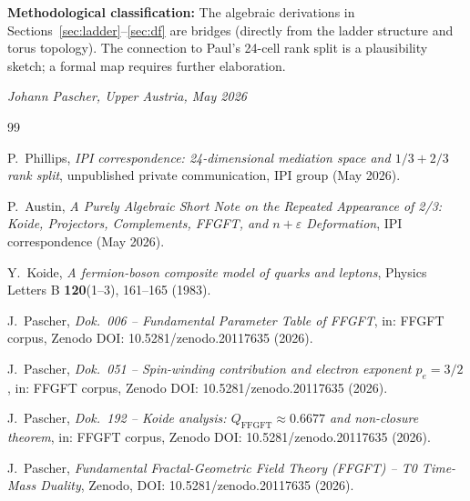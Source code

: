 \bigskip
\noindent
\textbf{Methodological classification:}
The algebraic derivations in Sections~\ref{sec:ladder}--\ref{sec:df}
are bridges (directly from the ladder structure and torus topology).
The connection to Paul's 24-cell rank split is a plausibility sketch;
a formal map requires further elaboration.

\bigskip
\begin{flushright}
\textit{Johann Pascher, Upper Austria, May 2026}
\end{flushright}

\begin{thebibliography}{99}

P.~Phillips,
\textit{IPI correspondence: 24-dimensional mediation space and
\(1/3 + 2/3\) rank split},
unpublished private communication, IPI group (May 2026).

P.~Austin,
\textit{A Purely Algebraic Short Note on the Repeated Appearance of 2/3:
Koide, Projectors, Complements, FFGFT, and \(n+\varepsilon\) Deformation},
IPI correspondence (May 2026).

Y.~Koide,
\textit{A fermion-boson composite model of quarks and leptons},
Physics Letters B \textbf{120}(1--3), 161--165 (1983).

J.~Pascher,
\textit{Dok.~006 -- Fundamental Parameter Table of FFGFT},
in: FFGFT corpus, Zenodo DOI: 10.5281/zenodo.20117635 (2026).

J.~Pascher,
\textit{Dok.~051 -- Spin-winding contribution and electron exponent
\(p_e = 3/2\)},
in: FFGFT corpus, Zenodo DOI: 10.5281/zenodo.20117635 (2026).

J.~Pascher,
\textit{Dok.~192 -- Koide analysis: \(Q_{\text{FFGFT}} \approx 0.6677\)
and non-closure theorem},
in: FFGFT corpus, Zenodo DOI: 10.5281/zenodo.20117635 (2026).

J.~Pascher,
\textit{Fundamental Fractal-Geometric Field Theory (FFGFT) --
T0 Time-Mass Duality},
Zenodo, DOI: 10.5281/zenodo.20117635 (2026).

\end{thebibliography}
